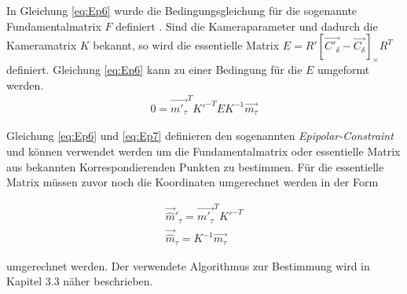 In Gleichung \ref{eq:Ep6} wurde die Bedingungsgleichung für die sogenannte Fundamentalmatrix $F$ definiert \cite{Hoffmann}. Sind die Kameraparameter und dadurch die Kameramatrix $K$ bekannt, so wird die essentielle Matrix $E=R' \left[ \vec{C'_\delta}-\vec{C_\delta}\right]_\times R^T$ definiert. Gleichung \ref{eq:Ep6} kann zu einer Bedingung für die $E$ umgeformt werden.
\begin{gather}
	0=\vec{m'_\tau}^TK'^{-T}EK^{-1}\vec{m_\tau}\label{eq:Ep7}
\end{gather}

Gleichung \ref{eq:Ep6} und \ref{eq:Ep7} definieren den sogenannten \textit{Epipolar-Constraint}\cite{HZ,Hoffmann} und können verwendet werden um die Fundamentalmatrix oder essentielle Matrix aus bekannten Korrespondierenden Punkten zu bestimmen. Für die essentielle Matrix müssen zuvor noch die Koordinaten umgerechnet werden in der Form

\begin{gather}
	\vec{\hat{m}}'_\tau = \vec{m'_\tau}^TK'^{-T}\\
	\vec{\hat{m}}_\tau = K^{-1}\vec{m_\tau}\label{eq:equ8}
\end{gather}

umgerechnet werden\cite{HZ,phdextrinsicPara}.  Der verwendete Algorithmus zur Bestimmung wird in Kapitel 3.3 näher beschrieben.\\











